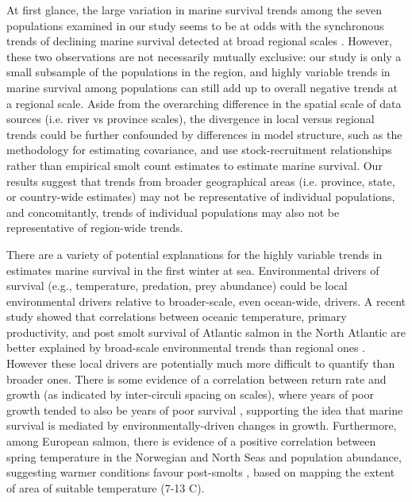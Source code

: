 \documentclass[12pt]{article}
\begin{document}
At first glance, the large variation in marine survival trends among the seven
populations examined in our study seems to be at odds with the synchronous
trends of declining marine survival detected at broad regional scales
\citep{Olmos2019}. However, these two observations are not necessarily mutually
exclusive: our study is only a small subsample of the populations in the region,
and highly variable trends in marine survival among populations can still add
up to overall negative trends at a regional scale.
Aside from the overarching difference in the spatial scale of data sources
(i.e. river vs province scales), the divergence in local versus regional
trends could be further confounded by differences in model structure, such as
the methodology for estimating covariance, and use stock-recruitment
relationships rather than empirical smolt count estimates to estimate marine
survival.
Our results suggest that trends from broader geographical areas (i.e.
province, state, or country-wide estimates) may not be representative of
individual populations, and concomitantly, trends of individual populations
may also not be representative of region-wide trends.


There are a variety of potential explanations for the highly variable trends
in estimates marine survival in the first winter at sea.
Environmental drivers of survival (e.g., temperature, predation, prey abundance) 
could be local environmental drivers
relative to broader-scale, even ocean-wide, drivers.
A recent study showed that correlations between oceanic temperature, primary
productivity, and post smolt survival of Atlantic salmon in the North Atlantic
are better explained by broad-scale environmental trends than regional ones
\citep{Olmos2020}.
However these local drivers are potentially much more difficult to quantify than 
broader ones.
There is some evidence of a correlation between return rate and growth (as
indicated by inter-circuli spacing on scales), where years of poor growth
tended to also be years of poor survival \citep{Friedland1993}, supporting the
idea that marine survival is mediated by environmentally-driven changes in growth.
Furthermore, among European salmon, there is evidence of a positive correlation
between spring temperature in the Norwegian and North Seas and population abundance, 
suggesting warmer
conditions favour post-smolts \citep{Friedland1998}, based on mapping the
extent of area of suitable temperature (7-13 \textdegree C).
\end{document}
